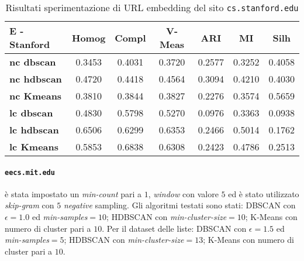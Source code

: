 \begin{table}[H]
	\begin{tabular}{| l | c | c | c | c | c | c |}
	\hline
	\textbf{E - Stanford}  & \textbf{Homog} & \textbf{Compl} & \textbf{V-Meas}  & \textbf{ARI}  & \textbf{MI}  & \textbf{Silh} \\ [3ex] \hline
	\textbf{nc dbscan} & 0.3453 & 0.4031 & 0.3720 & 0.2577 & 0.3252 & 0.4058\\ [3ex]
	 \hline 
	\textbf{nc hdbscan} & 0.4720 & 0.4418 & 0.4564 & 0.3094 & 0.4210 & 0.4030\\ [3ex]
	 \hline
	\textbf{nc Kmeans} & 0.3810 & 0.3844 & 0.3827 & 0.2276 & 0.3574 & 0.5659\\ [3ex]
	 \hline	
	\textbf{lc dbscan} & 0.4830 & 0.5798 & 0.5270 & 0.0976 & 0.3363 & 0.0938\\ [3ex]
	\hline
	\textbf{lc hdbscan} & 0.6506 & 0.6299 & 0.6353 & 0.2466 & 0.5014 & 0.1762\\ [3ex]
	\hline
	\textbf{lc Kmeans} & 0.5853 & 0.6838 & 0.6308 & 0.2423 & 0.4786 & 0.2513\\ [3ex]
	\hline
	\end{tabular}
	\caption{Risultati sperimentazione di URL embedding del sito \texttt{cs.stanford.edu}}
	\label{metricheEmbedStanf}
\end{table}

\paragraph{\texttt{eecs.mit.edu}} è stata impostato un \textit{min-count} pari a $1$, \textit{window} con valore $5$ ed è stato utilizzato \textit{skip-gram} con $5$ \textit{negative} sampling. Gli algoritmi testati sono stati: DBSCAN con $\epsilon = 1.0$ ed \textit{min-samples}$ = 10$; HDBSCAN con \textit{min-cluster-size}$=10$; K-Means con numero di cluster pari a $10$. Per il dataset delle liste: DBSCAN con $\epsilon = 1.5$ ed \textit{min-samples}$ = 5$; HDBSCAN con \textit{min-cluster-size}$=13$; K-Means con numero di cluster pari a $10$.

